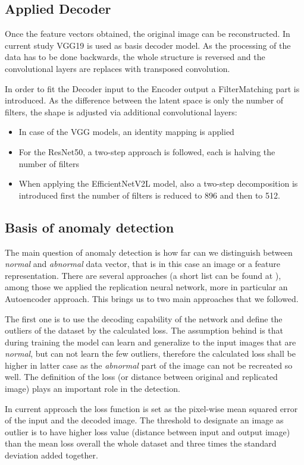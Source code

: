 \subsection{Applied Decoder}
Once the feature vectors obtained, the original image can be reconstructed.
In current study VGG19 is used as basis decoder model.
As the processing of the data has to be done backwards, the whole structure is
reversed and the convolutional layers are replaces with transposed convolution.

In order to fit the Decoder input to the Encoder output a FilterMatching part is introduced.
As the difference between the latent space is only the number of filters,
the shape is adjusted via additional convolutional layers:
\begin{itemize}
    \item In case of the VGG models, an identity mapping is applied
    \item For the ResNet50, a two-step approach is followed, each is halving the number of filters
    \item When applying the EfficientNetV2L model, also a two-step decomposition is introduced
          first the number of filters is reduced to 896 and then to 512.
\end{itemize}

\subsection{Basis of anomaly detection}
The main question of anomaly detection is how far can we distinguish between \emph{normal}
and \emph{abnormal} data vector, that is in this case an image or a feature representation.
There are several approaches (a short list can be found at \cite{_anomaly_2023}), among those
we applied the replication neural network, more in particular an Autoencoder approach.
This brings us to two main approaches that we followed.

The first one is to use the decoding capability of the network and define the outliers of the
dataset by the calculated loss.
The assumption behind is that during training the model can learn and generalize to the input
images that are \emph{normal}, but can not learn the few outliers, therefore the calculated loss
shall be higher in latter case as the \emph{abnormal} part of the image can not be recreated so well.
The definition of the loss (or distance between original and replicated image) plays an important
role in the detection.

In current approach the loss function is set as the pixel-wise mean squared error of the input
and the decoded image.
The threshold to designate an image as outlier is to have higher loss value
(distance between input and output image) than the mean loss overall the whole dataset and
three times the standard deviation added together.

